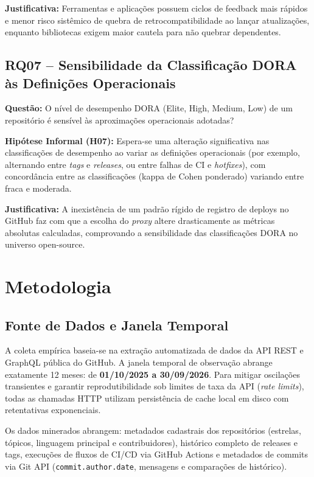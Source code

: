 \documentclass[12pt]{article}
\begin{document}
\textbf{Justificativa:} Ferramentas e aplicações possuem ciclos de feedback mais rápidos e menor risco sistêmico de quebra de retrocompatibilidade ao lançar atualizações, enquanto bibliotecas exigem maior cautela para não quebrar dependentes.

\subsection{RQ07 -- Sensibilidade da Classificação DORA às Definições Operacionais}
\textbf{Questão:} O nível de desempenho DORA (Elite, High, Medium, Low) de um repositório é sensível às aproximações operacionais adotadas?

\textbf{Hipótese Informal (H07):} Espera-se uma alteração significativa nas classificações de desempenho ao variar as definições operacionais (por exemplo, alternando entre \textit{tags} e \textit{releases}, ou entre falhas de CI e \textit{hotfixes}), com concordância entre as classificações (kappa de Cohen ponderado) variando entre fraca e moderada.

\textbf{Justificativa:} A inexistência de um padrão rígido de registro de deploys no GitHub faz com que a escolha do \textit{proxy} altere drasticamente as métricas absolutas calculadas, comprovando a sensibilidade das classificações DORA no universo open-source.

\section{Metodologia}

\subsection{Fonte de Dados e Janela Temporal}
A coleta empírica baseia-se na extração automatizada de dados da API REST e GraphQL pública do GitHub. A janela temporal de observação abrange exatamente 12 meses: de \textbf{01/10/2025 a 30/09/2026}. Para mitigar oscilações transientes e garantir reprodutibilidade sob limites de taxa da API (\textit{rate limits}), todas as chamadas HTTP utilizam persistência de cache local em disco com retentativas exponenciais.

Os dados minerados abrangem: metadados cadastrais dos repositórios (estrelas, tópicos, linguagem principal e contribuidores), histórico completo de releases e tags, execuções de fluxos de CI/CD via GitHub Actions e metadados de commits via Git API (\texttt{commit.author.date}, mensagens e comparações de histórico).
\end{document}
